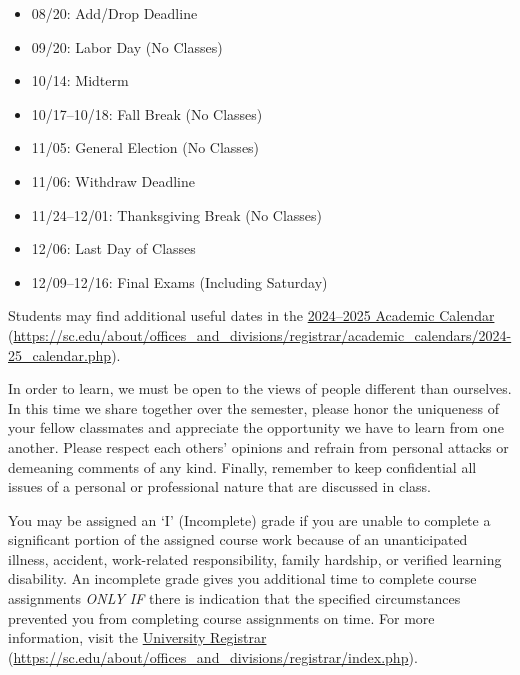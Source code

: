 \documentclass[11pt,letterpaper]{article}
\begin{document}

	\begin{itemize}
	\item 08/20: Add/Drop Deadline
	\item 09/20: Labor Day (No Classes)
	\item 10/14: Midterm
	\item 10/17--10/18: Fall Break (No Classes)
	\item 11/05: General Election (No Classes)
	\item 11/06: Withdraw Deadline
	\item 11/24--12/01: Thanksgiving Break (No Classes)
	\item 12/06: Last Day of Classes
	\item 12/09--12/16: Final Exams (Including Saturday)
	\end{itemize}

Students may find additional useful dates in the \href{https://sc.edu/about/offices\_and\_divisions/registrar/academic\_calendars/2024-25\_calendar.php}{2024--2025 Academic Calendar} (\url{https://sc.edu/about/offices\_and\_divisions/registrar/academic\_calendars/2024-25\_calendar.php}). \sectionbreak





\newpage






In order to learn, we must be open to the views of people different than ourselves. In this time we share together over the semester, please honor the uniqueness of your fellow classmates and appreciate the opportunity we have to learn from one another. Please respect each others' opinions and refrain from personal attacks or demeaning comments of any kind. Finally, remember to keep confidential all issues of a personal or professional nature that are discussed in class. \sectionbreak




You may be assigned an `I' (Incomplete) grade if you are unable to complete a significant portion of the assigned course work because of an unanticipated illness, accident, work-related responsibility, family hardship, or verified learning disability. An incomplete grade gives you additional time to complete course assignments {\itshape ONLY IF} there is indication that the specified circumstances prevented you from completing course assignments on time. For more information, visit the \href{https://sc.edu/about/offices\_and\_divisions/registrar/index.php}{University Registrar} (\url{https://sc.edu/about/offices\_and\_divisions/registrar/index.php}). \sectionbreak
\end{document}
